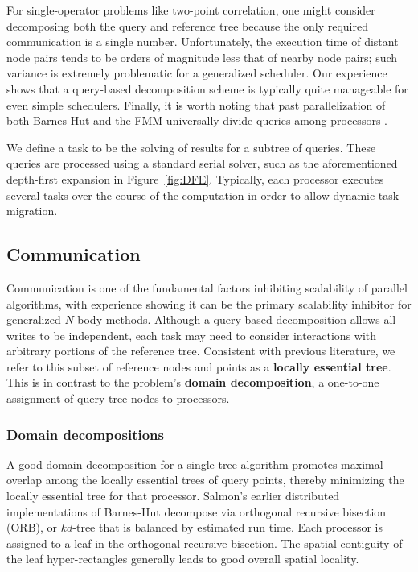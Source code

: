 \documentclass[twoside,leqno,twocolumn]{article}
\newcommand{\fig}[1]{Figure~\ref{fig:#1}}
\newcommand{\mysubsub}[1]{\subsubsection{#1} }
\newcommand{\defterm}[1]{{\bf #1}}
\begin{document}
For single-operator problems like two-point correlation, one might consider decomposing both the query and reference tree because the only required communication is a single number.
Unfortunately, the execution time of distant node pairs tends to be orders of magnitude less that of nearby node pairs; such variance is extremely problematic for a generalized scheduler.
Our experience shows that a query-based decomposition scheme is typically quite manageable for even simple schedulers.
Finally, it is worth noting that past parallelization of both Barnes-Hut and the FMM universally divide queries among processors \cite{salmon_thesis, singh_thesis, liu94experiences}.

We define a task to be the solving of results for a subtree of queries.
These queries are processed using a standard serial solver, such as the aforementioned depth-first expansion in \fig{DFE}.
Typically, each processor executes several tasks over the course of the computation in order to allow dynamic task migration.

\subsection{Communication}

Communication is one of the fundamental factors inhibiting scalability of parallel algorithms, with experience showing it can be the primary scalability inhibitor for generalized $N$-body methods.
Although a query-based decomposition allows all writes to be independent, each task may need to consider interactions with arbitrary portions of the reference tree.
Consistent with previous literature\cite{salmon_thesis, singh_thesis}, we refer to this subset of reference nodes and points as a \defterm{locally essential tree}.
This is in contrast to the problem's \defterm{domain decomposition}, a one-to-one assignment of query tree nodes to processors.

\mysubsub{Domain decompositions}
A good domain decomposition for a single-tree algorithm promotes maximal overlap among the locally essential trees of query points, thereby minimizing the locally essential tree for that processor.
Salmon's earlier distributed implementations of Barnes-Hut \cite{salmon_thesis} decompose via orthogonal recursive bisection (ORB), or $kd$-tree that is balanced by estimated run time.
Each processor is assigned to a leaf in the orthogonal recursive bisection.
The spatial contiguity of the leaf hyper-rectangles generally leads to good overall spatial locality.
\end{document}

